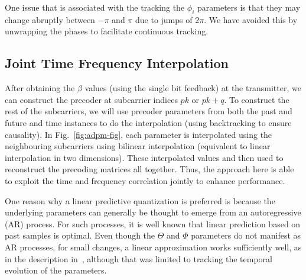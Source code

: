 \documentclass[journal,10pt,twocolumn]{IEEEtran}
\begin{document}
One issue that is associated with the tracking the $\phi_i$ parameters
is that they may change abruptly between $-\pi$ and
$\pi$ due to jumps of $2\pi$. We have avoided this by unwrapping the
phases to facilitate continuous tracking.
\subsection{Joint Time Frequency Interpolation}
\label{interp}
After obtaining the $\beta$ values (using the single bit feedback) at
the transmitter, we can construct the precoder at subcarrier indices
$pk$ or $pk+q$. To construct the rest of the subcarriers, we will use
precoder parameters from both the past and future and time instances
to do the interpolation (using backtracking to ensure causality). In
Fig.~\ref{fig:adpm-fig}, each parameter is interpolated using the
neighbouring subcarriers using bilinear interpolation (equivalent to
linear interpolation in two dimensions). These interpolated values and
then used to reconstruct the precoding matrices all together. Thus,
the approach here is able to exploit the time and frequency
correlation jointly to enhance performance.

One reason why a linear predictive quantization is preferred is
because the underlying parameters can generally be thought to emerge
from an autoregressive (AR) process. For such processes, it is well known
that linear prediction based on past samples is optimal. Even though
the $\Theta$ and $\Phi$ parameters do not manifest as AR processes,
for small changes, a linear approximation works sufficiently
well, as in the description in~\cite{4114278}, although that was
limited to tracking the temporal evolution of the parameters.
\end{document}
